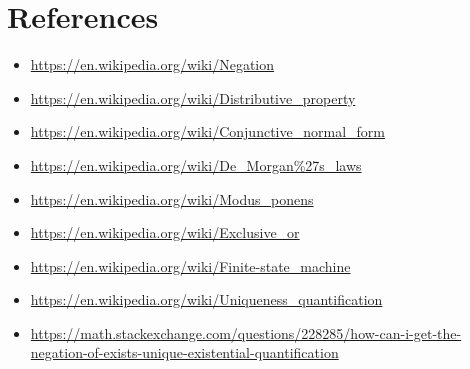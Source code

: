 \documentclass[a4paper, 14pt]{report}
\begin{document}
\pagebreak

\section*{References}

\begin{itemize}[noitemsep]		
  \item \url{https://en.wikipedia.org/wiki/Negation}
	\item \url{https://en.wikipedia.org/wiki/Distributive\_property}
	\item \url{https://en.wikipedia.org/wiki/Conjunctive\_normal\_form}
	\item \url{https://en.wikipedia.org/wiki/De\_Morgan\%27s\_laws}
	\item \url{https://en.wikipedia.org/wiki/Modus\_ponens}
	\item \url{https://en.wikipedia.org/wiki/Exclusive\_or}
	\item \url{https://en.wikipedia.org/wiki/Finite-state\_machine}
	\item \url{https://en.wikipedia.org/wiki/Uniqueness\_quantification}
	\item \url{https://math.stackexchange.com/questions/228285/how-can-i-get-the-negation-of-exists-unique-existential-quantification}
\end{itemize}		
\end{document}
